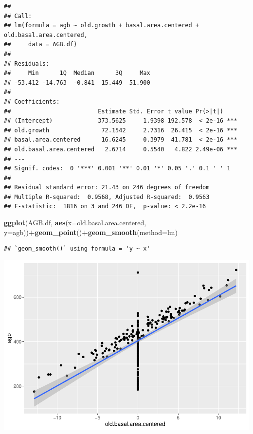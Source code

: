 \documentclass[
]{article}
\newenvironment{Shaded}{\begin{snugshade}}{\end{snugshade}}
\newcommand{\AttributeTok}[1]{\textcolor[rgb]{0.13,0.29,0.53}{#1}}
\newcommand{\FunctionTok}[1]{\textcolor[rgb]{0.13,0.29,0.53}{\textbf{#1}}}
\newcommand{\NormalTok}[1]{#1}
\newcommand{\SpecialCharTok}[1]{\textcolor[rgb]{0.81,0.36,0.00}{\textbf{#1}}}
\begin{document}
\begin{verbatim}
## 
## Call:
## lm(formula = agb ~ old.growth + basal.area.centered + old.basal.area.centered, 
##     data = AGB.df)
## 
## Residuals:
##     Min      1Q  Median      3Q     Max 
## -53.412 -14.763  -0.841  15.449  51.900 
## 
## Coefficients:
##                         Estimate Std. Error t value Pr(>|t|)    
## (Intercept)             373.5625     1.9398 192.578  < 2e-16 ***
## old.growth               72.1542     2.7316  26.415  < 2e-16 ***
## basal.area.centered      16.6245     0.3979  41.781  < 2e-16 ***
## old.basal.area.centered   2.6714     0.5540   4.822 2.49e-06 ***
## ---
## Signif. codes:  0 '***' 0.001 '**' 0.01 '*' 0.05 '.' 0.1 ' ' 1
## 
## Residual standard error: 21.43 on 246 degrees of freedom
## Multiple R-squared:  0.9568, Adjusted R-squared:  0.9563 
## F-statistic:  1816 on 3 and 246 DF,  p-value: < 2.2e-16
\end{verbatim}

\begin{Shaded}
\begin{Highlighting}[]
\FunctionTok{ggplot}\NormalTok{(AGB.df, }\FunctionTok{aes}\NormalTok{(}\AttributeTok{x=}\NormalTok{old.basal.area.centered, }\AttributeTok{y=}\NormalTok{agb))}\SpecialCharTok{+}\FunctionTok{geom\_point}\NormalTok{()}\SpecialCharTok{+}\FunctionTok{geom\_smooth}\NormalTok{(}\AttributeTok{method=}\NormalTok{lm)}
\end{Highlighting}
\end{Shaded}

\begin{verbatim}
## `geom_smooth()` using formula = 'y ~ x'
\end{verbatim}

\includegraphics{Stats-Lab-7_files/figure-latex/unnamed-chunk-13-1.pdf}
\end{document}
